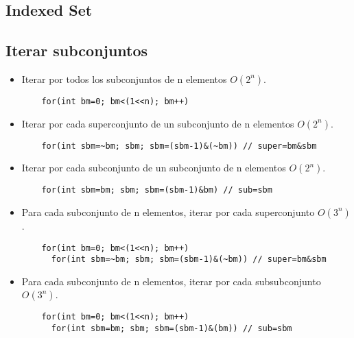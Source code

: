 \documentclass[a4paper,11pt,landscape,twocolumn]{article}
\begin{document}
\subsection{Indexed Set}



\subsection{Iterar subconjuntos}

\begin{itemize}
  \item Iterar por todos los subconjuntos de n elementos $O(2^n)$.
  \begin{lstlisting}
    for(int bm=0; bm<(1<<n); bm++)
  \end{lstlisting}

  \item Iterar por cada superconjunto de un subconjunto de n elementos $O(2^n)$.
  \begin{lstlisting}
    for(int sbm=~bm; sbm; sbm=(sbm-1)&(~bm)) // super=bm&sbm
  \end{lstlisting}

  \item Iterar por cada subconjunto de un subconjunto de n elementos $O(2^n)$.
  \begin{lstlisting}
    for(int sbm=bm; sbm; sbm=(sbm-1)&bm) // sub=sbm
  \end{lstlisting}

  \item Para cada subconjunto de n elementos, iterar por cada superconjunto $O(3^n)$.
  \begin{lstlisting}
    for(int bm=0; bm<(1<<n); bm++)
      for(int sbm=~bm; sbm; sbm=(sbm-1)&(~bm)) // super=bm&sbm
  \end{lstlisting}

  \item Para cada subconjunto de n elementos, iterar por cada subsubconjunto $O(3^n)$.
  \begin{lstlisting}
    for(int bm=0; bm<(1<<n); bm++)
      for(int sbm=bm; sbm; sbm=(sbm-1)&(bm)) // sub=sbm
  \end{lstlisting}
\end{itemize}
\end{document}
